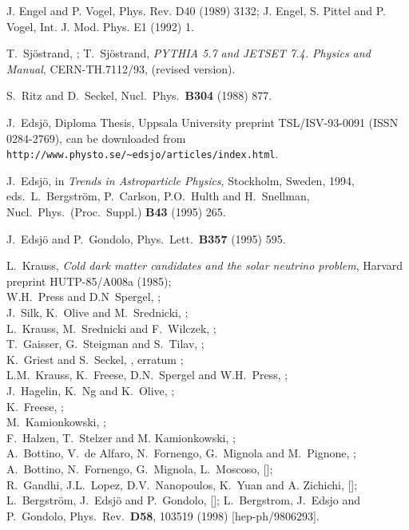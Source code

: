 \begin{thebibliography}{99}
 J. Engel and P. Vogel, Phys. Rev. D40 (1989) 3132;
J. Engel, S. Pittel and P. Vogel, Int. J. Mod. Phys. E1 (1992) 1.

T.~Sj\"{o}strand, ;
T.~Sj\"{o}strand, {\em PYTHIA 5.7 and JETSET 7.4. Physics and Manual},
CERN-TH.7112/93,  (revised version).


S.~Ritz and D.~Seckel, Nucl.\ Phys.\ {\bf B304} (1988) 877.


J.~Edsj\"{o}, Diploma Thesis, Uppsala University preprint
TSL/ISV-93-0091 (ISSN 0284-2769), can be downloaded from
\texttt{http://www.physto.se/\~{ }edsjo/articles/index.html}.

J.~Edsj\"{o}, in {\em Trends in Astroparticle Physics}, Stockholm,
Sweden, 1994, eds.\ L.~Bergstr\"om, P.~Carlson, P.O.~Hulth and
H.~Snellman, Nucl.\ Phys.\ (Proc.\ Suppl.) {\bf B43} (1995) 265.


J.~Edsj{\"o} and P.~Gondolo, Phys.~Lett.~{\bf B357} (1995) 595.

L.~Krauss, \emph{Cold dark matter candidates and the solar neutrino
problem}, Harvard preprint HUTP-85/A008a (1985);\\
W.H.~Press and D.N~Spergel, ;\\
J.~Silk, K.~Olive and M.~Srednicki, ;\\
L.~Krauss, M.~Srednicki and F.~Wilczek, ;\\
T.~Gaisser, G.~Steigman and S.~Tilav, ;\\
K.~Griest and S.~Seckel, ,
erratum ;\\
L.M.~Krauss, K.~Freese, D.N.~Spergel and W.H.~Press, ;\\
J.~Hagelin, K.~Ng and K.~Olive, ;\\
K.~Freese, ;\\
M.~Kamionkowski, ;\\
F.~Halzen, T.~Stelzer and M. Kamionkowski, ;\\
A.~Bottino, V.~de Alfaro, N.~Fornengo, G.~Mignola and
M.~Pignone, ;
\noindent A.~Bottino, N.~Fornengo, G.~Mignola, L.~Moscoso,
 [];\\
R.~Gandhi, J.L.~Lopez, D.V.~Nanopoulos, K.~Yuan and A. Zichichi,
 [];\\
L.~Bergstr{\"o}m, J.~Edsj{\"o} and P.~Gondolo,
 [];
L.~Bergstrom, J.~Edsjo and P.~Gondolo,
Phys.\ Rev.\  {\bf D58}, 103519 (1998)
[hep-ph/9806293].


\end{thebibliography}
